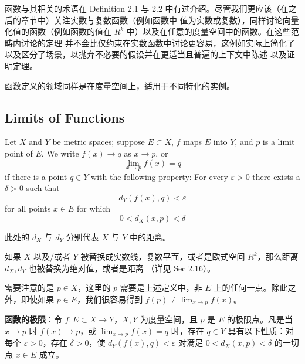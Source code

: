 \documentclass[../poma-notes.tex]{subfiles}
\begin{document}
函数与其相关的术语在 Definition 2.1 与 2.2 中有过介绍。尽管我们更应该（在之后的章节中）关注实数与复数函数（例如函数中
值为实数或复数），同样讨论向量化值的函数（例如函数的值在 $R^k$ 中）以及在任意的度量空间中的函数。在这些范畴内讨论的定理
并不会比仅约束在实数函数中讨论更容易，这例如实际上简化了以及区分了场景，以抛弃不必要的假设并在更适当且普遍的上下文中陈述
以及证明定理。

函数定义的领域同样是在度量空间上，适用于不同特化的实例。

\subsection*{Limits of Functions}

\begin{definition}
  Let $X$ and $Y$ be metric spaces; suppose $E \subset X$, $f$ maps $E$ into $Y$, and $p$ is a limit
  point of $E$. We write $f(x) \to q$ as $x \to p$, or
  \begin{equation}
    \lim_{x \to p} f(x) = q
  \end{equation}
  if there is a point $q \in Y$ with the following property: For every $\varepsilon > 0$ there exists a
  $\delta > 0$ such that
  \begin{equation}
    d_Y(f(x),q) < \varepsilon
  \end{equation}
  for all points $x \in E$ for which
  \begin{equation}
    0 < d_X(x,p) < \delta
  \end{equation}
\end{definition}

此处的 $d_X$ 与 $d_Y$ 分别代表 $X$ 与 $Y$ 中的距离。

如果 $X$ 以及/或者 $Y$ 被替换成实数线，复数平面，或者是欧式空间 $R^k$，那么距离 $d_X, d_Y$ 也被替换为绝对值，或者是距离
（详见 Sec 2.16）。

需要注意的是 $p \in X$，这里的 $p$ 需要是上述定义中，非 $E$ 上的任何一点。除此之外，即使如果 $p \in E$，我们很容易得到
$f(p) \ne \lim_{x \to p} f(x)$。

\begin{anote}
  \textbf{函数的极限}：令 $f: E \subset X \to Y$，$X, Y$ 为度量空间，且 $p$ 是 $E$ 的极限点。凡是当 $x \to p$ 时
  $f(x) \to p$，或 $\lim_{x \to p} f(x) = q$ 时，存在 $q \in Y$ 具有以下性质：对每个 $\varepsilon > 0$，存在
  $\delta > 0$，使 $d_Y(f(x),q) < \varepsilon$ 对满足 $0 < d_X(x, p) < \delta$ 的一切点 $x \in E$ 成立。
\end{anote}
\end{document}
